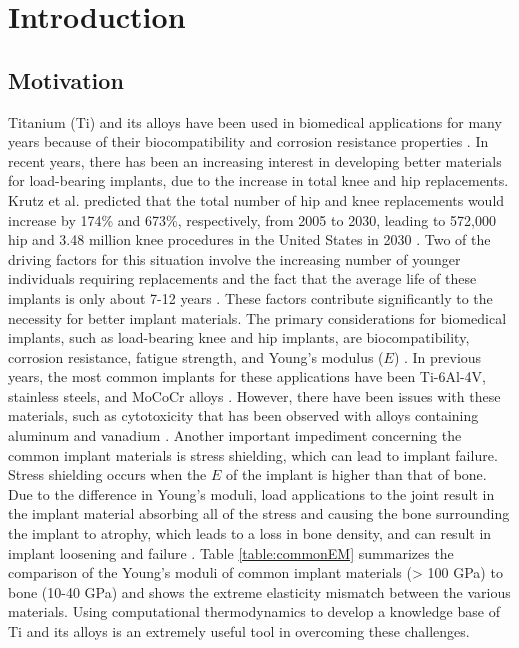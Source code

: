 \chapter{Introduction} \label{chapter1:introduction}

\section{\sloppy Motivation}
Titanium (Ti) and its alloys have been used in biomedical applications for many years because of their biocompatibility and corrosion resistance properties \cite{Long1998a}. In recent years, there has been an increasing interest in developing better materials for load-bearing implants, due to the increase in total knee and hip replacements. Krutz et al. predicted that the total number of hip and knee replacements would increase by 174\% and 673\%, respectively, from 2005 to 2030, leading to 572,000 hip and 3.48 million knee procedures in the United States in 2030 \cite{Kurtz2007}. Two of the driving factors for this situation involve the increasing number of younger individuals requiring replacements and the fact that the average life of these implants is only about 7-12 years \cite{Krishna2007a}. These factors contribute significantly to the necessity for better implant materials. The primary considerations for biomedical implants, such as load-bearing knee and hip implants, are biocompatibility, corrosion resistance, fatigue strength, and Young's modulus ($E$) \cite{Long1998a}. In previous years, the most common implants for these applications have been Ti-6Al-4V, stainless steels, and MoCoCr alloys \cite{Niinomi2003,Niinomi2012}. However, there have been issues with these materials, such as cytotoxicity that has been observed with alloys containing aluminum and vanadium \cite{Ito1995a}. Another important impediment concerning the common implant materials is stress shielding, which can lead to implant failure. Stress shielding occurs when the $E$ of the implant is higher than that of bone. Due to the difference in Young's moduli, load applications to the joint result in the implant material absorbing all of the stress and causing the bone surrounding the implant to atrophy, which leads to a loss in bone density, and can result in implant loosening and failure \cite{Long1998a}.  Table \ref{table:commonEM} summarizes the comparison of the Young's moduli of common implant materials (> 100 GPa) to bone (10-40 GPa) \cite{Long1998a} and shows the extreme elasticity mismatch between the various materials. Using computational thermodynamics to develop a knowledge base of Ti and its alloys is an extremely useful tool in overcoming these challenges.

